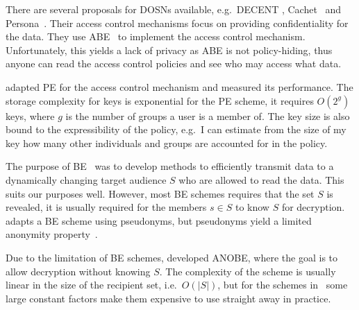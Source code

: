 
There are several proposals for \acp{DOSN} available, e.g.~DECENT
\cite{decent}, Cachet~\cite{cachet} and Persona~\cite{persona}.
Their access control mechanisms focus on providing confidentiality for the 
data.
They use \ac{ABE}~\cite{abe} to implement the access control mechanism.
Unfortunately, this yields a lack of privacy as \ac{ABE} is not policy-hiding, 
thus anyone can read the access control policies and see who may access what 
data.

\citet{predicateac} adapted \ac{PE} for the access control mechanism and 
measured its performance.
The storage complexity for keys is exponential for the \ac{PE} scheme, it 
requires \(O(2^g)\) keys, where \(g\) is the number of groups a user is 
a member of.
The key size is also bound to the expressibility of the policy, e.g.~I can 
estimate from the size of my key how many other individuals and groups are 
accounted for in the policy.

The purpose of \ac{BE}~\cite{broadcastenc} was to develop methods to 
efficiently transmit data to a dynamically changing target audience \(S\) who 
are allowed to read the data.
This suits our purposes well.
However, most \ac{BE} schemes requires that the set \(S\) is revealed, it is 
usually required for the members \(s\in S\) to know \(S\) for decryption.
\citet{gunther2012cryptographic} adapts a \ac{BE} scheme using pseudonyms, but 
pseudonyms yield a limited anonymity property~\cite{gunther2012cryptographic}.

Due to the limitation of \ac{BE} schemes, \citet{anobe} developed \ac{ANOBE}, 
where the goal is to allow decryption without knowing \(S\).
The complexity of the scheme is usually linear in the size of the recipient 
set, i.e.~\(O(|S|)\), but for the schemes in~\cite{anobe} some large constant 
factors make them expensive to use straight away in practice.


